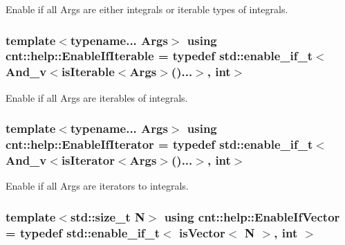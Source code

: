 Enable if all \textquotesingle{}Args\textquotesingle{} are either integrals or iterable types of integrals. 

\subsubsection[{\texorpdfstring{Enable\+If\+Iterable}{EnableIfIterable}}]{\setlength{\rightskip}{0pt plus 5cm}template$<$typename... Args$>$ using {\bf cnt\+::help\+::\+Enable\+If\+Iterable} = typedef std\+::enable\+\_\+if\+\_\+t$<${\bf And\+\_\+v}$<${\bf is\+Iterable}$<$Args$>$()...$>$, int$>$}\hypertarget{namespacecnt_1_1help_af28e6c14e973fb60e8a41270dbcb249c}{}\label{namespacecnt_1_1help_af28e6c14e973fb60e8a41270dbcb249c}


Enable if all \textquotesingle{}Args\textquotesingle{} are iterables of integrals. 

\subsubsection[{\texorpdfstring{Enable\+If\+Iterator}{EnableIfIterator}}]{\setlength{\rightskip}{0pt plus 5cm}template$<$typename... Args$>$ using {\bf cnt\+::help\+::\+Enable\+If\+Iterator} = typedef std\+::enable\+\_\+if\+\_\+t$<${\bf And\+\_\+v}$<${\bf is\+Iterator}$<$Args$>$()...$>$, int$>$}\hypertarget{namespacecnt_1_1help_a104cf8940601cb2ad309c0993667d91f}{}\label{namespacecnt_1_1help_a104cf8940601cb2ad309c0993667d91f}


Enable if all \textquotesingle{}Args\textquotesingle{} are iterators to integrals. 

\subsubsection[{\texorpdfstring{Enable\+If\+Vector}{EnableIfVector}}]{\setlength{\rightskip}{0pt plus 5cm}template$<$std\+::size\+\_\+t N$>$ using {\bf cnt\+::help\+::\+Enable\+If\+Vector} = typedef std\+::enable\+\_\+if\+\_\+t$<$ {\bf is\+Vector}$<$ N $>$, int $>$}\hypertarget{namespacecnt_1_1help_ac3c31a0ef3a73ff16367e0c7ae9df545}{}\label{namespacecnt_1_1help_ac3c31a0ef3a73ff16367e0c7ae9df545}


